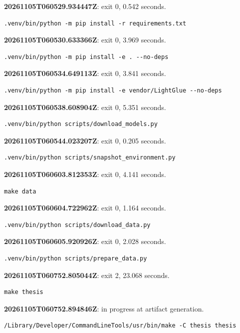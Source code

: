 \noindent\textbf{20261105T060529.934447Z}: exit 0, 0.542 seconds.
\begin{lstlisting}[numbers=none]
.venv/bin/python -m pip install -r requirements.txt
\end{lstlisting}

\noindent\textbf{20261105T060530.633366Z}: exit 0, 3.969 seconds.
\begin{lstlisting}[numbers=none]
.venv/bin/python -m pip install -e . --no-deps
\end{lstlisting}

\noindent\textbf{20261105T060534.649113Z}: exit 0, 3.841 seconds.
\begin{lstlisting}[numbers=none]
.venv/bin/python -m pip install -e vendor/LightGlue --no-deps
\end{lstlisting}

\noindent\textbf{20261105T060538.608904Z}: exit 0, 5.351 seconds.
\begin{lstlisting}[numbers=none]
.venv/bin/python scripts/download_models.py
\end{lstlisting}

\noindent\textbf{20261105T060544.023207Z}: exit 0, 0.205 seconds.
\begin{lstlisting}[numbers=none]
.venv/bin/python scripts/snapshot_environment.py
\end{lstlisting}

\noindent\textbf{20261105T060603.812353Z}: exit 0, 4.141 seconds.
\begin{lstlisting}[numbers=none]
make data
\end{lstlisting}

\noindent\textbf{20261105T060604.722962Z}: exit 0, 1.164 seconds.
\begin{lstlisting}[numbers=none]
.venv/bin/python scripts/download_data.py
\end{lstlisting}

\noindent\textbf{20261105T060605.920926Z}: exit 0, 2.028 seconds.
\begin{lstlisting}[numbers=none]
.venv/bin/python scripts/prepare_data.py
\end{lstlisting}

\noindent\textbf{20261105T060752.805044Z}: exit 2, 23.068 seconds.
\begin{lstlisting}[numbers=none]
make thesis
\end{lstlisting}

\noindent\textbf{20261105T060752.894846Z}: in progress at artifact generation.
\begin{lstlisting}[numbers=none]
/Library/Developer/CommandLineTools/usr/bin/make -C thesis thesis
\end{lstlisting}

